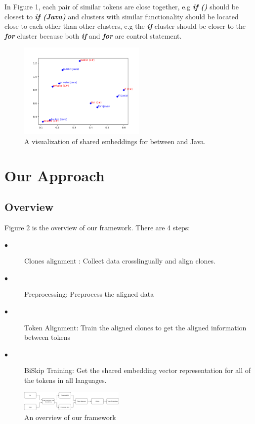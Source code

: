 In Figure 1, each pair of similar tokens are close together, e.g \textit{\textbf{if ()}} should be closest to \textit{\textbf{if (Java)}} and clusters with similar functionality should be located close to each other than other clusters, e.g the \textit{\textbf{if}} cluster should be closer to the \textit{\textbf{for}} cluster because both \textit{\textbf{if}} and \textit{\textbf{for}} are control statement.

\begin{figure}[t!]
	\includegraphics[width=0.55\textwidth]{example_bi2vec_tsne}
	\caption{A visualization of shared embeddings for between  and Java.}
	\label{fig:clf}
\end{figure}

\section{Our Approach}
\subsection{Overview}
Figure 2 is the overview of our framework. There are 4 steps:
\begin{description}
	\item [$\bullet$] Clones alignment : Collect data crosslingually and align clones.
	\item [$\bullet$] Preprocessing: Preprocess the aligned data
	\item [$\bullet$] Token Alignment: Train the aligned clones to get the aligned information between tokens
	\item [$\bullet$] BiSkip Training: Get the shared embedding vector representation for all of the tokens in all languages.
\end{description}

\begin{figure}[t!]
	\includegraphics[width=0.45\textwidth]{steps}
	\caption{An overview of our framework}
	\label{fig:clf}
\end{figure}
 



